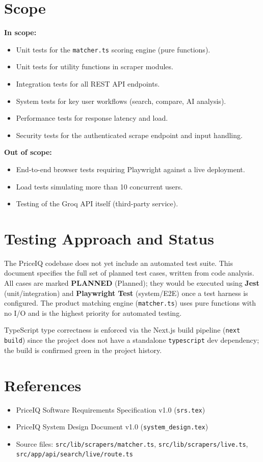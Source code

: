 \documentclass[12pt,a4paper]{report}
\newcommand{\PEND}{\textcolor{pendyellow}{\textbf{PLANNED}}}
\begin{document}
\section{Scope}
\textbf{In scope:}
\begin{itemize}[noitemsep]
  \item Unit tests for the \texttt{matcher.ts} scoring engine (pure functions).
  \item Unit tests for utility functions in scraper modules.
  \item Integration tests for all REST API endpoints.
  \item System tests for key user workflows (search, compare, AI analysis).
  \item Performance tests for response latency and load.
  \item Security tests for the authenticated scrape endpoint and input handling.
\end{itemize}

\textbf{Out of scope:}
\begin{itemize}[noitemsep]
  \item End-to-end browser tests requiring Playwright against a live deployment.
  \item Load tests simulating more than 10 concurrent users.
  \item Testing of the Groq API itself (third-party service).
\end{itemize}

\section{Testing Approach and Status}
\begin{notebox}
The PriceIQ codebase does not yet include an automated test suite. This
document specifies the full set of planned test cases, written from code
analysis. All cases are marked \PEND{} (Planned); they would be executed
using \textbf{Jest} (unit/integration) and \textbf{Playwright Test}
(system/E2E) once a test harness is configured. The product matching engine
(\texttt{matcher.ts}) uses pure functions with no I/O and is the highest
priority for automated testing.

TypeScript type correctness is enforced via the Next.js build pipeline
(\texttt{next build}) since the project does not have a standalone
\texttt{typescript} dev dependency; the build is confirmed green in the
project history.
\end{notebox}

\section{References}
\begin{itemize}[noitemsep]
  \item PriceIQ Software Requirements Specification v1.0 (\texttt{srs.tex})
  \item PriceIQ System Design Document v1.0 (\texttt{system\_design.tex})
  \item Source files: \texttt{src/lib/scrapers/matcher.ts},
        \texttt{src/lib/scrapers/live.ts},
        \texttt{src/app/api/search/live/route.ts}
\end{itemize}
\end{document}
